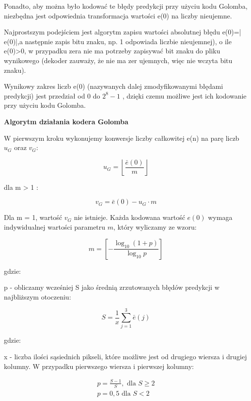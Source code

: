 \documentclass{article}
\begin{document}
Ponadto, aby można było kodować te błędy predykcji przy użyciu kodu Golomba, niezbędna jest odpowiednia transformacja wartości e(0) na liczby nieujemne.

Najprostszym podejściem jest algorytm zapisu wartości absolutnej błędu e(0)=| e(0)|,a następnie zapis bitu znaku, np. 1 odpowiada liczbie nieujemnej), o ile e(0)>0, w przypadku zera nie ma potrzeby zapisywać bit znaku do pliku wynikowego (dekoder zauważy, że nie ma zer ujemnych, więc nie wczyta bitu znaku).

Wynikowy zakres liczb e(0) (nazywanych dalej zmodyfikowanymi błędami predykcji) jest przedział od 0 do $2^8 - 1$ , dzięki czemu możliwe jest ich kodowanie przy użyciu kodu Golomba.



\textbf{Algorytm działania kodera Golomba}

W pierwszym kroku wykonujemy konwersje liczby całkowitej e(n) na parę liczb $u_G$ oraz $v_G$:
	
\begin{equation}
u_{G}=\left\lfloor\frac{\bar{e}(0)}{m}\right\rfloor
\end{equation}	
	
dla m > 1 :
	
\begin{equation}
v_{G}=\bar{e}(0)-u_{G} \cdot m
\end{equation}	
	
Dla  m = 1, wartość $v_G$ nie istnieje. Każda kodowana wartość $e(0)$ wymaga indywidualnej wartości parametru $m$, który wyliczamy ze wzoru:
	
\begin{equation}
m=\left[-\frac{\log _{10}(1+p)}{\log _{10} p}\right]
\end{equation}
	
gdzie:

p - obliczamy wcześniej S jako średnią zrzutowanych błędów predykcji w najbliższym otoczeniu:
	
\begin{equation}
S=\frac{1}{x} \sum_{j=1}^{3} \bar{e}(j)
\end{equation}
	
gdzie:
	
x - liczba ilości sąsiednich pikseli, które możliwe jest od drugiego wiersza i drugiej kolumny. W przypadku pierwszego wiersza i pierwszej kolumny:

\begin{equation}
\begin{array}{l}
p=\frac{S-1}{S}, \text { dla } S \geq 2 \\
p=0,5 \text { dla } S<2
\end{array}
\end{equation}
\end{document}
